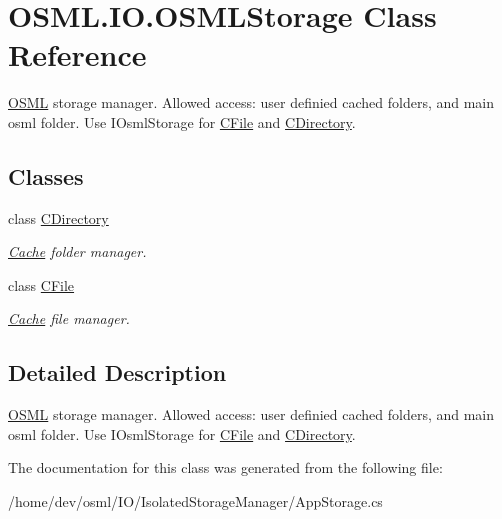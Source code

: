 \hypertarget{classOSML_1_1IO_1_1OSMLStorage}{}\section{O\+S\+M\+L.\+I\+O.\+O\+S\+M\+L\+Storage Class Reference}
\label{classOSML_1_1IO_1_1OSMLStorage}


\mbox{\hyperlink{namespaceOSML}{O\+S\+ML}} storage manager. Allowed access\+: user definied cached folders, and main osml folder. Use I\+Osml\+Storage for \mbox{\hyperlink{classOSML_1_1IO_1_1OSMLStorage_1_1CFile}{C\+File}} and \mbox{\hyperlink{classOSML_1_1IO_1_1OSMLStorage_1_1CDirectory}{C\+Directory}}.  


\subsection*{Classes}
\begin{DoxyCompactItemize}
\item 
class \mbox{\hyperlink{classOSML_1_1IO_1_1OSMLStorage_1_1CDirectory}{C\+Directory}}
\begin{DoxyCompactList}\small\item\em \mbox{\hyperlink{namespaceOSML_1_1Cache}{Cache}} folder manager. \end{DoxyCompactList}\item 
class \mbox{\hyperlink{classOSML_1_1IO_1_1OSMLStorage_1_1CFile}{C\+File}}
\begin{DoxyCompactList}\small\item\em \mbox{\hyperlink{namespaceOSML_1_1Cache}{Cache}} file manager. \end{DoxyCompactList}\end{DoxyCompactItemize}


\subsection{Detailed Description}
\mbox{\hyperlink{namespaceOSML}{O\+S\+ML}} storage manager. Allowed access\+: user definied cached folders, and main osml folder. Use I\+Osml\+Storage for \mbox{\hyperlink{classOSML_1_1IO_1_1OSMLStorage_1_1CFile}{C\+File}} and \mbox{\hyperlink{classOSML_1_1IO_1_1OSMLStorage_1_1CDirectory}{C\+Directory}}. 



The documentation for this class was generated from the following file\+:\begin{DoxyCompactItemize}
\item 
/home/dev/osml/\+I\+O/\+Isolated\+Storage\+Manager/App\+Storage.\+cs\end{DoxyCompactItemize}
